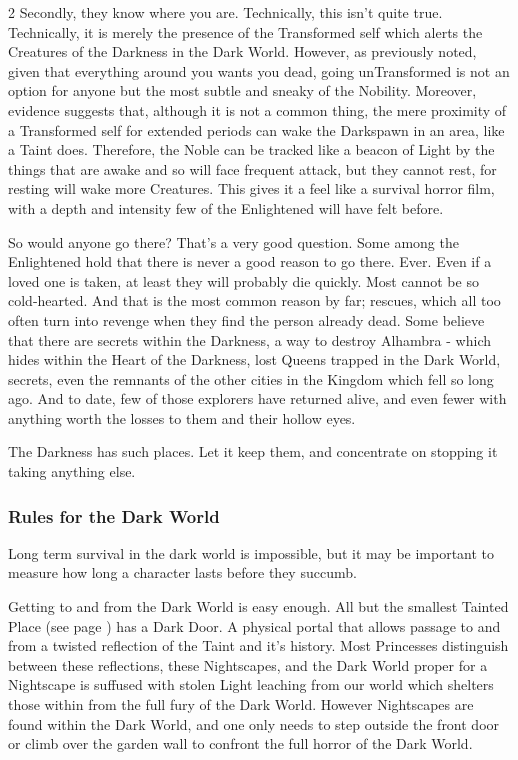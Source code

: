 \begin{multicols}{2}
Secondly, they know where you are. Technically, this isn't quite true. Technically, it is merely the presence of the Transformed self which alerts the Creatures of the Darkness in the Dark World. However, as previously noted, given that everything around you wants you dead, going unTransformed is not an option for anyone but the most subtle and sneaky of the Nobility. Moreover, evidence suggests that, although it is not a common thing, the mere proximity of a Transformed self for extended periods can wake the Darkspawn in an area, like a Taint does. Therefore, the Noble can be tracked like a beacon of Light by the things that are awake and so will face frequent attack, but they cannot rest, for resting will wake more Creatures. This gives it a feel like a survival horror film, with a depth and intensity few of the Enlightened will have felt before.

So would anyone go there? That's a very good question. Some among the Enlightened hold that there is never a good reason to go there. Ever. Even if a loved one is taken, at least they will probably die quickly. Most cannot be so cold-hearted. And that is the most common reason by far; rescues, which all too often turn into revenge when they find the person already dead. Some believe that there are secrets within the Darkness, a way to destroy Alhambra - which hides within the Heart of the Darkness, lost Queens trapped in the Dark World, secrets, even the remnants of the other cities in the Kingdom which fell so long ago. And to date, few of those explorers have returned alive, and even fewer with anything worth the losses to them and their hollow eyes.

The Darkness has such places. Let it keep them, and concentrate on stopping it taking anything else. 

\subsubsection*{Rules for the Dark World}

Long term survival in the dark world is impossible, but it may be important to measure how long a character lasts before they succumb. 

Getting to and from the Dark World is easy enough. All but the smallest Tainted Place (see page \pageref{TaintedPlaceRef}) has a Dark Door. A physical portal that allows passage to and from a twisted reflection of the Taint and it's history. Most Princesses distinguish between these reflections, these Nightscapes, and the Dark World proper for a Nightscape is suffused with stolen Light leaching from our world which shelters those within from the full fury of the Dark World. However Nightscapes are found within the Dark World, and one only needs to step outside the front door or climb over the garden wall to confront the full horror of the Dark World. 


\end{multicols}
